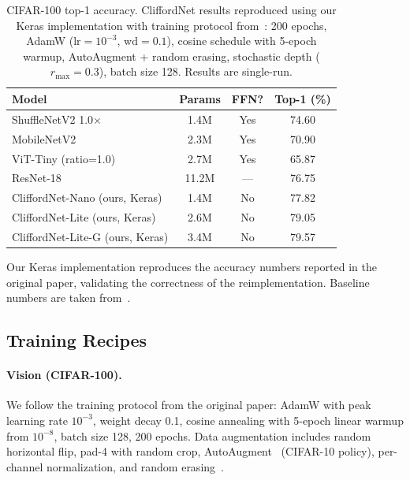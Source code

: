 \documentclass{article}
\begin{document}
\begin{table}[t]
\centering
\caption{CIFAR-100 top-1 accuracy. CliffordNet results reproduced using our Keras implementation with training protocol from~\citet{ji2026cliffordnet}: 200 epochs, AdamW ($\text{lr}{=}10^{-3}$, $\text{wd}{=}0.1$), cosine schedule with 5-epoch warmup, AutoAugment + random erasing, stochastic depth ($r_\text{max}{=}0.3$), batch size 128. Results are single-run.}
\label{tab:vision_results}
\begin{tabular}{lccc}
\toprule
\textbf{Model} & \textbf{Params} & \textbf{FFN?} & \textbf{Top-1 (\%)} \\
\midrule
ShuffleNetV2 1.0$\times$ & 1.4M  & Yes & 74.60 \\
MobileNetV2              & 2.3M  & Yes & 70.90 \\
ViT-Tiny (ratio=1.0)     & 2.7M  & Yes & 65.87 \\
ResNet-18~\citep{he2016deep} & 11.2M & --- & 76.75 \\
\midrule
CliffordNet-Nano (ours, Keras) & 1.4M & No & 77.82 \\
CliffordNet-Lite (ours, Keras) & 2.6M & No & 79.05 \\
CliffordNet-Lite-G (ours, Keras) & 3.4M & No & 79.57 \\
\bottomrule
\end{tabular}
\end{table}

Our Keras implementation reproduces the accuracy numbers reported in the original paper, validating the correctness of the reimplementation.
Baseline numbers are taken from~\citet{ji2026cliffordnet}.

\subsection{Training Recipes}

\paragraph{Vision (CIFAR-100).}
We follow the training protocol from the original paper: AdamW with peak learning rate $10^{-3}$, weight decay 0.1, cosine annealing with 5-epoch linear warmup from $10^{-8}$, batch size 128, 200 epochs.
Data augmentation includes random horizontal flip, pad-4 with random crop, AutoAugment~\citep{cubuk2019autoaugment} (CIFAR-10 policy), per-channel normalization, and random erasing~\citep{zhong2020random}.
\end{document}
